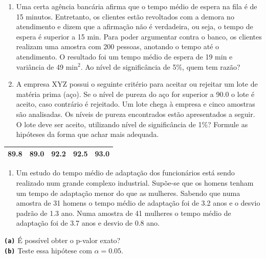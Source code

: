 \documentclass[
]{book}
\providecommand{\tightlist}{%
  \setlength{\itemsep}{0pt}\setlength{\parskip}{0pt}}
\theoremstyle{definition}
\theoremstyle{definition}
\theoremstyle{definition}
\theoremstyle{remark}
\begin{document}
\begin{enumerate}
\item
  Uma certa agência bancária afirma que o tempo médio de espera na fila é de 15 minutos. Entretanto, os clientes estão revoltados com a demora no atendimento e dizem que a afirmação não é verdadeira, ou seja, o tempo de espera é superior a 15 min. Para poder argumentar contra o banco, os clientes realizam uma amostra com 200 pessoas, anotando o tempo até o atendimento. O resultado foi um tempo médio de espera de 19 min e variância de 49 min\(^2\). Ao nível de significância de 5\%, quem tem razão?
\item
  A empresa XYZ possui o seguinte critério para aceitar ou rejeitar um lote de matéria prima (aço). Se o nível de pureza do aço for superior a 90.0 o lote é aceito, caso contrário é rejeitado. Um lote chega à empresa e cinco amostras são analisadas. Os níveis de pureza encontrados estão apresentados a seguir. O lote deve ser aceito, utilizando nível de significância de 1\%? Formule as hipóteses da forma que achar mais adequada.
\end{enumerate}

\begin{longtable}[]{@{}cllll@{}}
\toprule
89.8 & 89.0 & 92.2 & 92.5 & 93.0\tabularnewline
\midrule
\endhead
\bottomrule
\end{longtable}

\begin{enumerate}
\def\labelenumi{\arabic{enumi}.}
\setcounter{enumi}{10}
\tightlist
\item
  Um estudo do tempo médio de adaptação dos funcionários está sendo realizado num grande complexo industrial. Supõe-se que os homens tenham um tempo de adaptação menor do que as mulheres. Sabendo que numa amostra de 31 homens o tempo médio de adaptação foi de 3.2 anos e o desvio padrão de 1.3 ano. Numa amostra de 41 mulheres o tempo médio de adaptação foi de 3.7 anos e desvio de 0.8 ano.
\end{enumerate}

\textbf{\texttt{(a)}} É possível obter o p-valor exato?\\
\textbf{\texttt{(b)}} Teste essa hipótese com \(\alpha=0.05\).
\end{document}
